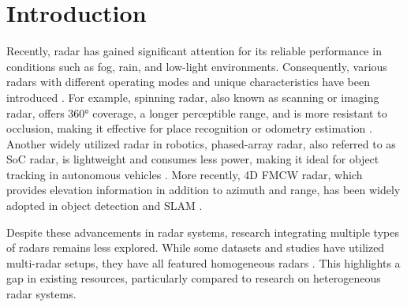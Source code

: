 \section{Introduction}
\label{sec:intro}
Recently, radar has gained significant attention for its reliable performance in conditions such as fog, rain, and low-light environments. Consequently, various radars with different operating modes and unique characteristics have been introduced \cite{harlow2023new}. For example, spinning radar, also known as scanning or imaging radar, offers 360° coverage, a longer perceptible range, and is more resistant to occlusion, making it effective for place recognition or odometry estimation \cite{gadd2020look, park2020pharao, jang2023raplace}. Another widely utilized radar in robotics, phased-array radar, also referred to as \ac{SoC} radar, is lightweight and consumes less power, making it ideal for object tracking in autonomous vehicles \cite{xia2021learning, sengupta2022robust, pearce2023multi}. More recently, 4D \ac{FMCW} radar, which provides elevation information in addition to azimuth and range, has been widely adopted in object detection and \ac{SLAM} \cite{tan20223, cao2018extended, zhuang20234d, zhang20234dradarslam, li20234d}. 



Despite these advancements in radar systems, research integrating multiple types of radars remains less explored. While some datasets and studies have utilized multi-radar setups, they have all featured homogeneous radars \cite{9495184, zhang2023dual, huai2024snail}. This highlights a gap in existing resources, particularly compared to research on heterogeneous radar systems.


